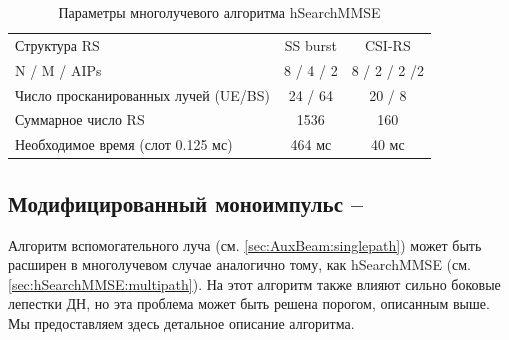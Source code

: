 \begin{table}[h!]
    \centering
    \caption{Параметры многолучевого алгоритма hSearchMMSE}
    \label{tab:4.6}
    \begin{tabular}{lcc}
        \toprule
        \midrule
        Структура RS                         & SS burst  & CSI-RS       \\
        N / M / AIPs                         & 8 / 4 / 2 & 8 / 2 / 2 /2 \\
        Число просканированных лучей (UE/BS) & 24 / 64   & 20 / 8       \\
        Суммарное число RS                   & 1536      & 160          \\
        Необходимое время (слот 0.125 мс)    & 464 мс    & 40 мс        \\
        \hline
    \end{tabular}
\end{table}



\subsection[Модифицированный моноимпульс]{Модифицированный моноимпульс -- \AuxBeam{}}
\label{sec:AuxBeam:multipath}


Алгоритм вспомогательного луча (см. \ref{sec:AuxBeam:singlepath})
может быть расширен в многолучевом
случае аналогично тому, как hSearchMMSE (см. \ref{sec:hSearchMMSE:multipath}).
На этот алгоритм также влияют сильно боковые лепестки ДН, но эта проблема
может быть решена порогом, описанным выше. Мы предоставляем здесь
детальное описание алгоритма.

